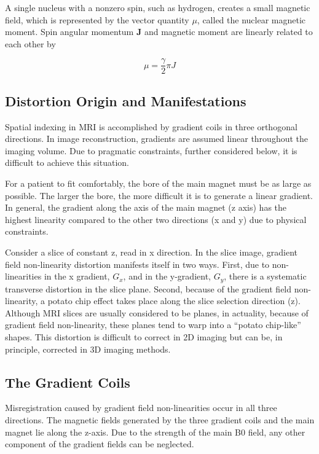 A single nucleus with a nonzero spin, such as hydrogen, creates a small magnetic field, which is 
represented by the vector quantity $\mu$, called the nuclear magnetic moment. Spin angular momentum 
$\textbf{J}$ and magnetic moment are linearly related to each other by

\begin{equation}
  \mu = \frac{\gamma}{2}\pi J
\end{equation}

\subsection{Distortion Origin and Manifestations}

Spatial indexing in MRI is accomplished by gradient coils in three orthogonal directions. In image 
reconstruction, gradients are assumed linear throughout the imaging volume. Due to pragmatic 
constraints, further considered below, it is difficult to achieve this situation.

For a patient to fit comfortably, the bore of the main magnet must be as large as possible. The larger 
the bore, the more difficult it is to generate a linear gradient. In general, the gradient along the 
axis of the main magnet (z axis) has the highest linearity compared to the other two directions 
(x and y) due to physical constraints.

Consider a slice of constant z, read in x direction. In the slice image, gradient field non-linearity 
distortion manifests itself in two ways. First, due to non-linearities in the x gradient, $G_x$, and in 
the y-gradient, $G_y$, there is a systematic transverse distortion in the slice plane. Second, 
because of 
the gradient field non-linearity, a potato chip effect takes place along the slice selection direction 
(z). Although MRI slices are usually considered to be planes, in actuality, because of gradient field 
non-linearity, these planes tend to warp into a “potato chip-like” shapes. This distortion is difficult
to correct in 2D imaging but can be, in principle, corrected in 3D imaging methods.

\subsection{The Gradient Coils}

Misregistration caused by gradient field non-linearities occur in all three directions. The magnetic 
fields generated by the three gradient coils and the main magnet lie along the z-axis.  Due to the 
strength of the main B0 field, any other component of the gradient fields can be neglected. 

